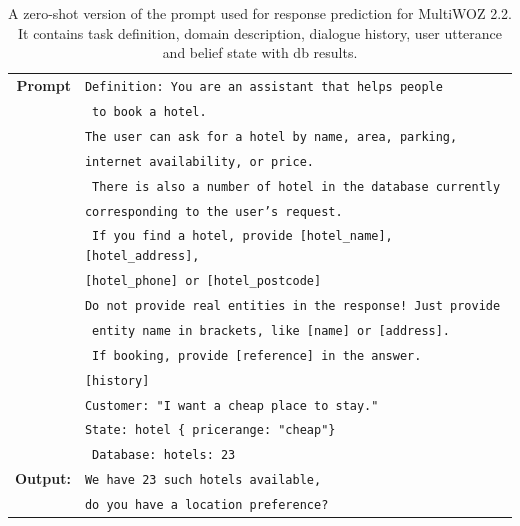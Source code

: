 \begin{table}[H]
    \centering\small
    \begin{tabular}{rl}
      \toprule
      \textbf{Prompt} & \texttt{{\color{cyan!80!yellow!80!black!100 }Definition: You are an assistant that helps people}} \\
      & \texttt{{\color{cyan!80!yellow!80!black!100} to book a hotel.}} \\
& \texttt{{\color{green!100!yellow!70!black!100 }The user can ask for a hotel by name, area, parking, }}\\
& \texttt{{\color{green!100!yellow!70!black!100 }internet availability, or price.}} \\
& \texttt{{\color{green!100!yellow!70!black!100 } There is also a number of hotel in the database currently }} \\
& \texttt{{\color{green!100!yellow!70!black!100 }corresponding to the user's request. }}\\
& \texttt{{\color{green!100!yellow!70!black!100 } If you find a hotel, provide [hotel\_name], [hotel\_address], }} \\
& \texttt{{\color{green!100!yellow!70!black!100 }[hotel\_phone] or [hotel\_postcode]}} \\
& \texttt{{\color{green!100!yellow!70!black!100 }Do not provide real entities in the response! Just provide}}\\
& \texttt{{\color{green!100!yellow!70!black!100 } entity name in brackets, like [name] or [address].} }\\
& \texttt{{\color{cyan!80!yellow!80!black!100 } If booking, provide [reference] in the answer. }} \\
& \texttt{{\color{red!100!yellow!70!black!100!}[history] }} \\
& \texttt{{\color{orange!50!yellow!90!black!100!}Customer: "I want a cheap place to stay." }}\\
& \texttt{{\color{magenta!100!yellow!70!black!100!}State: hotel \{ pricerange: "cheap"\} }} \\
& \texttt{{\color{magenta!100!yellow!70!black!100!} Database: hotels: 23 }}\\
      \midrule
      \textbf{Output:} & \texttt{We have 23 such hotels available,} \\
      & \texttt{do you have a location preference?} \\
      \bottomrule
  \end{tabular}
  \caption{A zero-shot version of the prompt used for response prediction for MultiWOZ 2.2.
  It contains {\color{cyan!80!yellow!80!black!100} task definition},  {\color{green!100!yellow!70!black!100!}domain description}, {\color{red!100!yellow!70!black!100!} dialogue history}, {\color{orange!50!yellow!90!black!100!} user utterance} and {\color{magenta!100!yellow!70!black!100!} belief state with db results}.}
  \label{07_tab:zero-shot-response}
\end{table}
